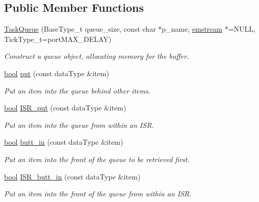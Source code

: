 \subsection*{Public Member Functions}
\begin{DoxyCompactItemize}
\item 
\mbox{\hyperlink{class_task_queue_a6eb3342ef8f6413673f1d718c1402385}{Task\+Queue}} (Base\+Type\+\_\+t queue\+\_\+size, const char $\ast$p\+\_\+name, \mbox{\hyperlink{classemstream}{emstream}} $\ast$=N\+U\+LL, Tick\+Type\+\_\+t=port\+M\+A\+X\+\_\+\+D\+E\+L\+AY)
\begin{DoxyCompactList}\small\item\em Construct a queue object, allocating memory for the buffer. \end{DoxyCompactList}\item 
\mbox{\hyperlink{group___motor___boolean___type_ga0ecf26b576b9a54eca656b9be7ba6a06}{bool}} \mbox{\hyperlink{class_task_queue_ad1dac62fcf253ab0cf50e47654c5fb29}{put}} (const data\+Type \&item)
\begin{DoxyCompactList}\small\item\em Put an item into the queue behind other items. \end{DoxyCompactList}\item 
\mbox{\hyperlink{group___motor___boolean___type_ga0ecf26b576b9a54eca656b9be7ba6a06}{bool}} \mbox{\hyperlink{class_task_queue_a51ff464dfa1c2be2beae36fdd9e36b44}{I\+S\+R\+\_\+put}} (const data\+Type \&item)
\begin{DoxyCompactList}\small\item\em Put an item into the queue from within an I\+SR. \end{DoxyCompactList}\item 
\mbox{\hyperlink{group___motor___boolean___type_ga0ecf26b576b9a54eca656b9be7ba6a06}{bool}} \mbox{\hyperlink{class_task_queue_a7c2810b4a2137dd88bc72fd1f20d18eb}{butt\+\_\+in}} (const data\+Type \&item)
\begin{DoxyCompactList}\small\item\em Put an item into the front of the queue to be retrieved first. \end{DoxyCompactList}\item 
\mbox{\hyperlink{group___motor___boolean___type_ga0ecf26b576b9a54eca656b9be7ba6a06}{bool}} \mbox{\hyperlink{class_task_queue_aa3d85ebdbee24d455f97b37a018f0230}{I\+S\+R\+\_\+butt\+\_\+in}} (const data\+Type \&item)
\begin{DoxyCompactList}\small\item\em Put an item into the front of the queue from within an I\+SR. \end{DoxyCompactList}\item 

\end{DoxyCompactItemize}
